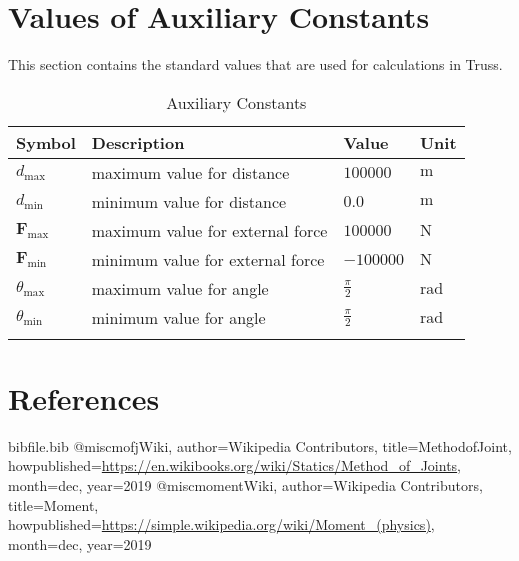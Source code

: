 \documentclass[12pt]{article}
\begin{document}
\section{Values of Auxiliary Constants}
\label{Sec:AuxConstants}
This section contains the standard values that are used for calculations in Truss.

\begin{longtable}{l l l l}
\toprule
\textbf{Symbol} & \textbf{Description} & \textbf{Value} & \textbf{Unit}
\\
\midrule
\endhead
${d_{\text{max}}}$ & maximum value for distance & $100000$ & ${\text{m}}$
\\
${d_{\text{min}}}$ & minimum value for distance & $0.0$ & ${\text{m}}$
\\
${\mathbf{F}_{\text{max}}}$ & maximum value for external force & $100000$ & ${\text{N}}$
\\
${\mathbf{F}_{\text{min}}}$ & minimum value for external force & $-100000$ & ${\text{N}}$
\\
${θ_{\text{max}}}$ & maximum value for angle & $\frac{π}{2}$ & ${\text{rad}}$
\\
${θ_{\text{min}}}$ & minimum value for angle & $\frac{π}{2}$ & ${\text{rad}}$
\\
\bottomrule
\caption{Auxiliary Constants}
\label{Table:TAuxConsts}
\end{longtable}
\section{References}
\label{Sec:References}
\begin{filecontents*}{bibfile.bib}
@misc{mofjWiki,
author={Wikipedia Contributors},
title={MethodofJoint},
howpublished={\url{https://en.wikibooks.org/wiki/Statics/Method\_of\_Joints}},
month=dec,
year={2019}}
@misc{momentWiki,
author={Wikipedia Contributors},
title={Moment},
howpublished={\url{https://simple.wikipedia.org/wiki/Moment\_(physics)}},
month=dec,
year={2019}}
\end{filecontents*}
\nocite{*}
\printbibliography[heading=none]
\end{document}
